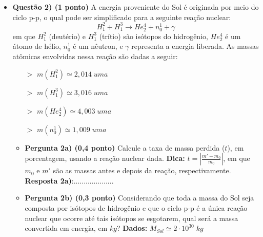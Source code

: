 \documentclass[a4paper, 12pt]{article}
\begin{document}
\begin{flushleft}
\begin{itemize}
		\item \textbf{Questão 2) (1 ponto)} A energia proveniente do Sol é originada por meio do ciclo p-p, o qual pode ser simplificado para a seguinte reação nuclear:
			$$H_1^2 + H_1^3 \longrightarrow He_2^4 + n_0^1 + \gamma$$
			em que $H_1^2$ (deutério) e $H_1^3$ (trítio) são isótopos do hidrogênio, $He_2^4$ é um átomo de hélio, $n_0^1$ é um nêutron, e $\gamma$ representa a energia liberada. \linebreak
			As massas atômicas envolvidas nessa reação são dadas a seguir:
				\begin{multicols}{2} \begin{itemize}
					\item[$>$] $m(H_1^2) \simeq 2,014 \; uma$
					\item[$>$] $m(H_1^3) \simeq 3,016 \; uma$
					\item[$>$] $m(He_2^4) \simeq 4,003 \; uma$
					\item[$>$] $m(n_0^1) \simeq 1,009 \; uma$
				\end{itemize} \end{multicols}
				\begin{itemize}
					\item \textbf{Pergunta 2a) (0,4 ponto)} Calcule a taxa de massa perdida ($t$), em porcentagem, usando a reação nuclear dada. \linebreak
						\textbf{Dica:} $t= \left| \frac{m'-m_0}{m_0} \right|$, em que $m_0$ e $m'$ são as massas antes e depois da reação, respectivamente.
						\linebreak \linebreak \linebreak \linebreak \linebreak \linebreak \linebreak \linebreak \linebreak
						\textbf{Resposta 2a)}:....................
					\item \textbf{Pergunta 2b) (0,3 ponto)} Considerando que toda a massa do Sol seja composta por isótopos de hidrogênio e que o ciclo p-p é a única reação nuclear que ocorre até tais isótopos se esgotarem, qual será a massa convertida em energia, em $kg$? \linebreak
						\textbf{Dados:} $M_{Sol} \simeq 2 \cdot 10^{30} \; kg$
						\linebreak \linebreak \linebreak \linebreak \linebreak \linebreak \linebreak

\end{itemize}
\end{itemize}
\end{flushleft}
\end{document}
